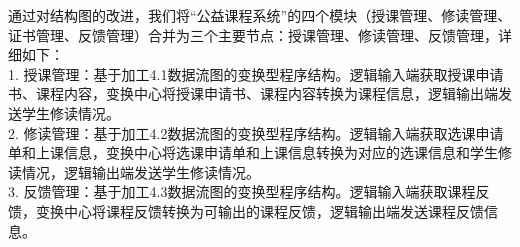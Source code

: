通过对结构图的改进，我们将“公益课程系统”的四个模块（授课管理、修读管理、证书管理、反馈管理）合并为三个主要节点：授课管理、修读管理、反馈管理，详细如下：\\
1. 授课管理：基于加工4.1数据流图的变换型程序结构。逻辑输入端获取授课申请书、课程内容，变换中心将授课申请书、课程内容转换为课程信息，逻辑输出端发送学生修读情况。\\
2. 修读管理：基于加工4.2数据流图的变换型程序结构。逻辑输入端获取选课申请单和上课信息，变换中心将选课申请单和上课信息转换为对应的选课信息和学生修读情况，逻辑输出端发送学生修读情况。\\
3. 反馈管理：基于加工4.3数据流图的变换型程序结构。逻辑输入端获取课程反馈，变换中心将课程反馈转换为可输出的课程反馈，逻辑输出端发送课程反馈信息。\\

\begin{landscape}
\begin{figure}[bp]

\end{figure}
\end{landscape}

